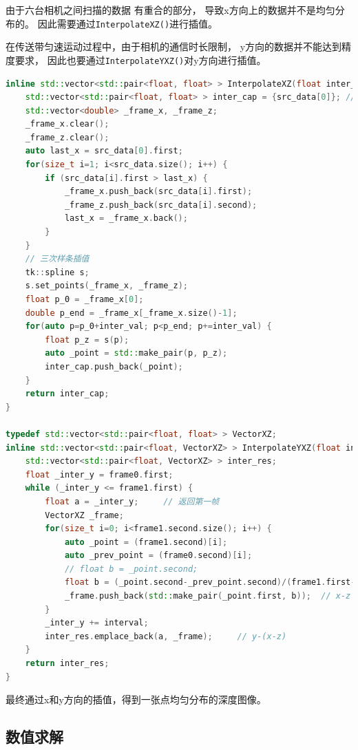 \documentclass{article}
\begin{document}
由于六台相机之间扫描的数据
有重合的部分，
导致x方向上的数据并不是均匀分布的。
因此需要通过\verb|InterpolateXZ()|进行插值。

在传送带匀速运动过程中，由于相机的通信时长限制，
y方向的数据并不能达到精度要求，
因此也要通过\verb|InterpolateYXZ()|对y方向进行插值。

\begin{lstlisting}[language=C++]
inline std::vector<std::pair<float, float> > InterpolateXZ(float inter_val, std::vector<std::pair<float, float> > src_data) {
    std::vector<std::pair<float, float> > inter_cap = {src_data[0]}; // 先插入第一点
    std::vector<double> _frame_x, _frame_z;
    _frame_x.clear();
    _frame_z.clear();
    auto last_x = src_data[0].first;
    for(size_t i=1; i<src_data.size(); i++) {
        if (src_data[i].first > last_x) {
            _frame_x.push_back(src_data[i].first);
            _frame_z.push_back(src_data[i].second);
            last_x = _frame_x.back();
        }
    }
    // 三次样条插值
    tk::spline s;
    s.set_points(_frame_x, _frame_z);
    float p_0 = _frame_x[0];
    double p_end = _frame_x[_frame_x.size()-1];
    for(auto p=p_0+inter_val; p<p_end; p+=inter_val) {
        float p_z = s(p);
        auto _point = std::make_pair(p, p_z);
        inter_cap.push_back(_point);
    }
    return inter_cap;
}

typedef std::vector<std::pair<float, float> > VectorXZ;    
inline std::vector<std::pair<float, VectorXZ> > InterpolateYXZ(float interval, std::pair<float, VectorXZ> frame0, std::pair<float, VectorXZ> frame1) {
    std::vector<std::pair<float, VectorXZ> > inter_res;
    float _inter_y = frame0.first;
    while (_inter_y <= frame1.first) {
        float a = _inter_y;     // 返回第一帧
        VectorXZ _frame;
        for(size_t i=0; i<frame1.second.size(); i++) {
            auto _point = (frame1.second)[i];
            auto _prev_point = (frame0.second)[i];
            // float b = _point.second;
            float b = (_point.second-_prev_point.second)/(frame1.first-frame0.first)*(a-frame0.first) + _prev_point.second;
            _frame.push_back(std::make_pair(_point.first, b));  // x-z
        }
        _inter_y += interval;
        inter_res.emplace_back(a, _frame);     // y-(x-z)
    }
    return inter_res;
}
\end{lstlisting}

最终通过x和y方向的插值，得到一张点均匀分布的深度图像。

\subsection{数值求解}
\end{document}
